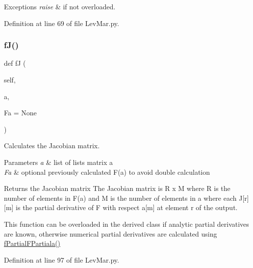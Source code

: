 \begin{DoxyExceptions}{Exceptions}
{\em raise} & if not overloaded. \\
\hline
\end{DoxyExceptions}


Definition at line 69 of file Lev\+Mar.\+py.

\mbox{\label{classSignalIntegrity_1_1Fit_1_1LevMar_1_1LevMar_a5852efb9aab8530b863efac8008cd425}} 
\subsubsection{\texorpdfstring{f\+J()}{fJ()}}
{\footnotesize\ttfamily def fJ (\begin{DoxyParamCaption}\item[{}]{self,  }\item[{}]{a,  }\item[{}]{Fa = {\ttfamily None} }\end{DoxyParamCaption})}



Calculates the Jacobian matrix. 


\begin{DoxyParams}{Parameters}
{\em a} & list of lists matrix a \\
\hline
{\em Fa} & optional previously calculated F(a) to avoid double calculation \\
\hline
\end{DoxyParams}
\begin{DoxyReturn}{Returns}
the Jacobian matrix The Jacobian matrix is R x M where R is the number of elements in F(a) and M is the number of elements in a where each J\mbox{[}r\mbox{]}\mbox{[}m\mbox{]} is the partial derivative of F with respect a\mbox{[}m\mbox{]} at element r of the output.
\end{DoxyReturn}
This function can be overloaded in the derived class if analytic partial derivatives are known, otherwise numerical partial derivatives are calculated using \hyperlink{classSignalIntegrity_1_1Fit_1_1LevMar_1_1LevMar_a2cb2f2f3d90e9eff6180a5b6a5ffa5cc}{f\+Partial\+F\+Partiala()} 

Definition at line 97 of file Lev\+Mar.\+py.

